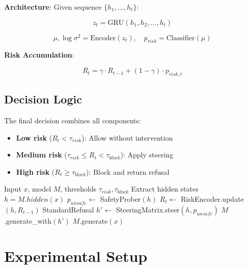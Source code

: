 \documentclass[10pt,twocolumn]{article}
\newcommand{\method}{HiSCaM}  %
\begin{document}
\textbf{Architecture}: Given sequence $\{h_1, ..., h_t\}$:

\begin{equation}
z_t = \text{GRU}(h_1, h_2, ..., h_t)
\end{equation}

\begin{equation}
\mu, \log\sigma^2 = \text{Encoder}(z_t), \quad p_{risk} = \text{Classifier}(\mu)
\end{equation}

\textbf{Risk Accumulation}:

\begin{equation}
R_t = \gamma \cdot R_{t-1} + (1-\gamma) \cdot p_{risk,t}
\end{equation}

\subsection{Decision Logic}

The final decision combines all components:

\begin{itemize}
\item \textbf{Low risk} ($R_t < \tau_{risk}$): Allow without intervention
\item \textbf{Medium risk} ($\tau_{risk} \leq R_t < \tau_{block}$): Apply steering
\item \textbf{High risk} ($R_t \geq \tau_{block}$): Block and return refusal
\end{itemize}

\begin{algorithm}[t]
\caption{\method{} Defense Pipeline}
\label{alg:defense}
\begin{algorithmic}[1]
\REQUIRE Input $x$, model $M$, thresholds $\tau_{risk}, \tau_{block}$
\STATE Extract hidden states $h = M.hidden(x)$
\STATE $p_{unsafe} \leftarrow$ SafetyProber$(h)$
\STATE $R_t \leftarrow$ RiskEncoder.update$(h, R_{t-1})$
    \RETURN StandardRefusal
    \STATE $h' \leftarrow$ SteeringMatrix.steer$(h, p_{unsafe})$
    \RETURN $M$.generate\_with$(h')$
\ELSE
    \RETURN $M$.generate$(x)$
\ENDIF
\end{algorithmic}
\end{algorithm}

\section{Experimental Setup}
\end{document}
